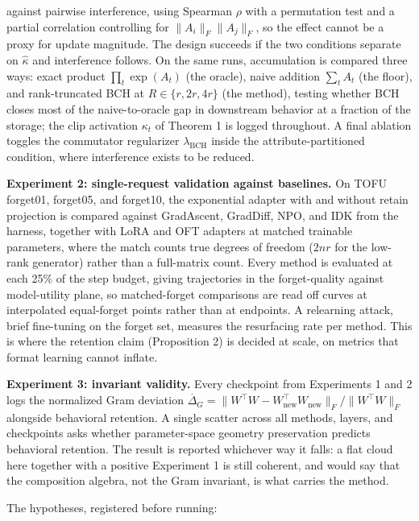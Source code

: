 \documentclass[
]{article}
\begin{document}
against pairwise interference, using Spearman \(\rho\) with a permutation test and a partial correlation controlling for \(\|A_i\|_F\|A_j\|_F\), so the effect cannot be a proxy for update magnitude. The design succeeds if the two conditions separate on \(\hat{\kappa}\) and interference follows. On the same runs, accumulation is compared three ways: exact product \(\prod_t\exp(A_t)\) (the oracle), naive addition \(\sum_t A_t\) (the floor), and rank-truncated BCH at \(R\in\{r,2r,4r\}\) (the method), testing whether BCH closes most of the naive-to-oracle gap in downstream behavior at a fraction of the storage; the clip activation \(\kappa_t\) of Theorem 1 is logged throughout. A final ablation toggles the commutator regularizer \(\lambda_{\mathrm{BCH}}\) inside the attribute-partitioned condition, where interference exists to be reduced.

\textbf{Experiment 2: single-request validation against baselines.} On TOFU forget01, forget05, and forget10, the exponential adapter with and without retain projection is compared against GradAscent, GradDiff, NPO, and IDK from the harness, together with LoRA and OFT adapters at matched trainable parameters, where the match counts true degrees of freedom (\(2nr\) for the low-rank generator) rather than a full-matrix count. Every method is evaluated at each 25\% of the step budget, giving trajectories in the forget-quality against model-utility plane, so matched-forget comparisons are read off curves at interpolated equal-forget points rather than at endpoints. A relearning attack, brief fine-tuning on the forget set, measures the resurfacing rate per method. This is where the retention claim (Proposition 2) is decided at scale, on metrics that format learning cannot inflate.

\textbf{Experiment 3: invariant validity.} Every checkpoint from Experiments 1 and 2 logs the normalized Gram deviation \(\overline{\Delta}_G=\|W^\top W-W_{\mathrm{new}}^\top W_{\mathrm{new}}\|_F/\|W^\top W\|_F\) alongside behavioral retention. A single scatter across all methods, layers, and checkpoints asks whether parameter-space geometry preservation predicts behavioral retention. The result is reported whichever way it falls: a flat cloud here together with a positive Experiment 1 is still coherent, and would say that the composition algebra, not the Gram invariant, is what carries the method.

The hypotheses, registered before running:
\end{document}
